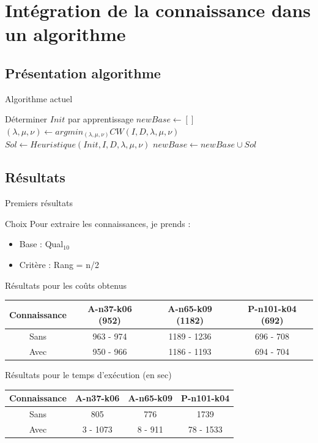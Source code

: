 \documentclass{beamer}
\begin{document}
\section{Intégration de la connaissance dans un algorithme}

\subsection{Présentation algorithme}
\begin{frame}{Algorithme actuel}

\begin{algorithm}[H]
\DontPrintSemicolon %
Déterminer $Init$ par apprentissage\;
$newBase \gets []$\;
 {
	$(\lambda,\mu,\nu) \gets argmin_{(\lambda,\mu,\nu)}CW(I,D,\lambda,\mu,\nu)$\;
	 {
		$Sol \gets Heuristique(Init,I,D,\lambda,\mu,\nu)$\;
		$newBase \gets newBase \cup Sol$\;
	}
}
\;

\end{algorithm}

\end{frame}

\subsection{Résultats}

\begin{frame}{Premiers résultats}
\begin{block}{Choix}
Pour extraire les connaissances, je prends :
\begin{itemize}
\item Base : Qual$_{10}$
\item Critère : Rang = n/2
\end{itemize}
\end{block}

Résultats pour les coûts obtenus
\begin{tabular}{|c|c|c|c|}
   \hline
   Connaissance & A-n37-k06 (952) & A-n65-k09 (1182) & P-n101-k04 (692)  \\
   \hline
   Sans & 963 - 974  & 1189 - 1236 & 696 - 708   \\
   \hline
   Avec & 950 - 966 & 1186 - 1193 & 694 - 704  \\
   \hline
\end{tabular}

Résultats pour le temps d'exécution (en sec)
\begin{tabular}{|c|c|c|c|}
   \hline
   Connaissance  & A-n37-k06 & A-n65-k09 & P-n101-k04  \\
   \hline
   Sans & 805  & 776 &  1739  \\
   \hline
   Avec & 3 - 1073 & 8 - 911 & 78 - 1533  \\
   \hline
\end{tabular}

\end{frame}
\end{document}

